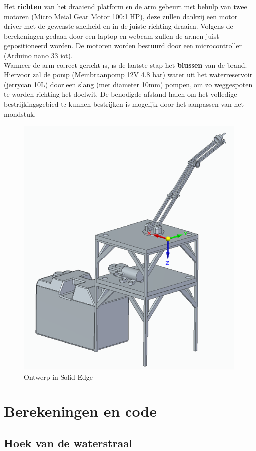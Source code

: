 \documentclass[kulak]{kulakarticle} %
\begin{document}
Het \textbf{richten} van het draaiend platform en de arm gebeurt met behulp van twee motoren (Micro Metal Gear Motor 100:1 HP), deze zullen dankzij een motor driver met de gewenste snelheid en in de juiste richting draaien. Volgens de berekeningen gedaan door een laptop en webcam zullen de armen juist gepositioneerd worden. De motoren worden bestuurd door een microcontroller (Arduino nano 33 iot). \\

Wanneer de arm correct gericht is, is de laatste stap het \textbf{blussen} van de brand. Hiervoor zal de pomp (Membraanpomp 12V 4.8 bar) water uit het waterreservoir (jerrycan 10L) door een slang (met diameter 10mm) pompen, om zo weggespoten te worden richting het doelwit. De benodigde afstand halen om het volledige bestrijkingsgebied te kunnen bestrijken is mogelijk door het aanpassen van het mondstuk.\\

\begin{figure} [!h]
	\centering
	\includegraphics[width = .6 \textwidth]{Solid Edge Assembly foto}
	\caption{Ontwerp in Solid Edge}
	\label{ontwerp}
\end{figure}



\section{Berekeningen en code}
\subsection{Hoek van de waterstraal}
\end{document}
